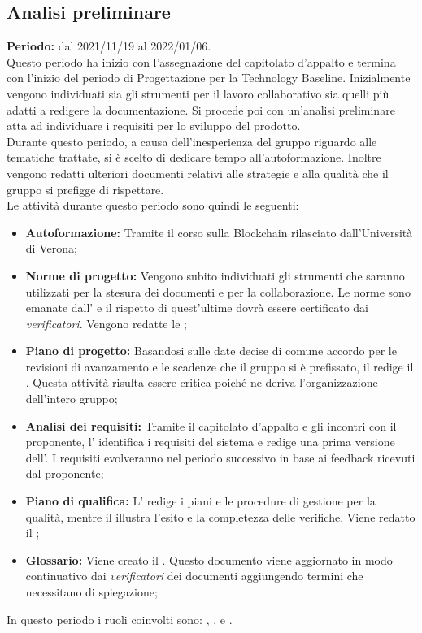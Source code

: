 \subsection{Analisi preliminare} \label{subsection:pianificazione_Analisi}
\textbf{Periodo:} dal 2021/11/19 al 2022/01/06.
\bigskip
\\Questo periodo ha inizio con l'assegnazione del capitolato d'appalto e termina con l'inizio del periodo di Progettazione per la Technology Baseline\glo{}.
Inizialmente vengono individuati sia gli strumenti per il lavoro collaborativo sia quelli più adatti a redigere la documentazione.
Si procede poi con un'analisi preliminare atta ad individuare i requisiti per lo sviluppo del prodotto.
\\Durante questo periodo, a causa dell'inesperienza del gruppo riguardo alle tematiche trattate, si è scelto di dedicare tempo all'autoformazione.
Inoltre vengono redatti ulteriori documenti relativi alle strategie e alla qualità che il gruppo \groupName{} si prefigge di rispettare.
\\Le attività durante questo periodo sono quindi le seguenti:
\begin{itemize}
  \item \textbf{Autoformazione:} Tramite il corso sulla Blockchain\glo{} rilasciato dall'Università di Verona;
  \item \textbf{Norme di progetto:} Vengono subito individuati gli strumenti che saranno utilizzati per la stesura dei documenti e per la collaborazione.
        Le norme sono emanate dall'\roleAdministratorLow{} e il rispetto di quest'ultime dovrà essere certificato dai \textit{verificatori}. Vengono redatte le \docNameNdP{};
  \item \textbf{Piano di progetto:} Basandosi sulle date decise di comune accordo per le revisioni di avanzamento e le scadenze che il gruppo si è prefissato, il \roleProjectManager{} redige il \docNamePdP{}.
        Questa attività risulta essere critica poiché ne deriva l'organizzazione dell'intero gruppo;
  \item \textbf{Analisi dei requisiti:} Tramite il capitolato d'appalto e gli incontri con il proponente, l'\roleAnalystLow{} identifica i requisiti del sistema e redige una prima versione dell'\docNameAdR{}.
        I requisiti evolveranno nel periodo successivo in base ai feedback ricevuti dal proponente;
  \item \textbf{Piano di qualifica:} L'\roleAdministratorLow{} redige i piani e le procedure di gestione per la qualità, mentre il \roleVerifierLow{} illustra l'esito e la completezza delle verifiche. Viene redatto il \docNamePdQ{};
  \item \textbf{Glossario:} Viene creato il \docNameGlo{}. Questo documento viene aggiornato in modo continuativo dai \textit{verificatori} dei documenti aggiungendo termini che necessitano di spiegazione;
\end{itemize}
In questo periodo i ruoli coinvolti sono: \roleProjectManagerLow{}, \roleAdministratorLow{}, \roleAnalystLow{} e \roleVerifierLow{}.

